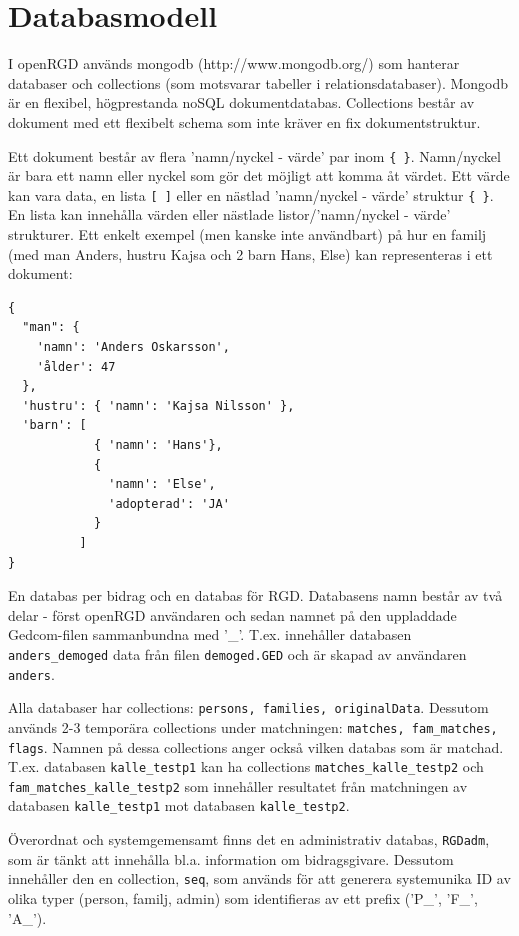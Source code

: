 \documentclass[swedish,11pt]{article}
\begin{document}
\section{Databasmodell}
I openRGD används mongodb (http://www.mongodb.org/) som hanterar databaser och collections (som
motsvarar tabeller i relationsdatabaser). Mongodb är en flexibel,
högprestanda noSQL dokumentdatabas. Collections består av dokument med
ett flexibelt schema som inte kräver en fix dokumentstruktur.

Ett dokument består av flera 'namn/nyckel - värde' par inom
\verb+{ }+. Namn/nyckel är bara ett namn eller nyckel som gör det
möjligt att komma åt värdet.
Ett värde kan vara data, en lista \verb+[ ]+ eller en nästlad
'namn/nyckel - värde' struktur \verb+{ }+. En lista kan innehålla
värden eller nästlade listor/'namn/nyckel - värde' strukturer. Ett enkelt exempel (men kanske
inte användbart) på hur en familj (med man Anders, hustru Kajsa och 2
barn Hans, Else) kan representeras i ett dokument:
\begin{verbatim}
{
  "man": {
    'namn': 'Anders Oskarsson',
    'ålder': 47
  },
  'hustru': { 'namn': 'Kajsa Nilsson' },
  'barn': [
            { 'namn': 'Hans'},
            { 
              'namn': 'Else',
              'adopterad': 'JA'
            }
          ]
}              
\end{verbatim}

En databas per bidrag och en databas för RGD. Databasens namn består
av två delar - först openRGD användaren och sedan namnet på den
uppladdade Gedcom-filen sammanbundna med '\_'. T.ex. innehåller
databasen \verb+anders_demoged+ data från filen \verb+demoged.GED+ och
är skapad av användaren \verb+anders+.

Alla databaser har collections: \verb+persons, families, originalData+. Dessutom
används 2-3 temporära collections under matchningen:
\verb+matches, fam_matches, flags+. Namnen på dessa collections anger
också vilken databas som är matchad. T.ex. databasen
\verb+kalle_testp1+ kan ha collections \verb+matches_kalle_testp2+ och
\verb+fam_matches_kalle_testp2+ som innehåller resultatet från matchningen av databasen
\verb+kalle_testp1+ mot databasen \verb+kalle_testp2+.

Överordnat och systemgemensamt finns det en administrativ databas,
\verb+RGDadm+, som är tänkt att
innehålla bl.a. information om bidragsgivare. Dessutom innehåller den
en collection, \verb+seq+, som används för att generera systemunika ID av
olika typer (person, familj, admin) som identifieras av ett prefix ('P\_', 'F\_', 'A\_').
\end{document}

